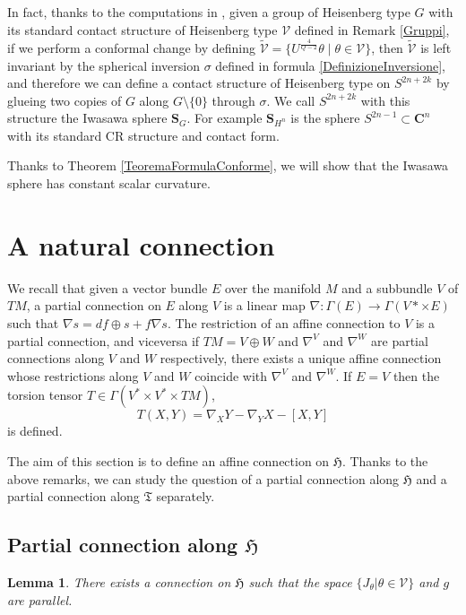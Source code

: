 \documentclass{article}
\newcommand{\ci}[1]{\mathscr{#1}}%
\newcommand{\g}[1]{\mathfrak{#1}}
\newcommand{\C}{\mathbf{C}}
\newtheorem{lemma}[proposizione]{Lemma}
\theoremstyle{definition}
\theoremstyle{remark}
\begin{document}
In fact, thanks to the computations in \cite{CDKR}, given a group of Heisenberg type $G$ with its standard contact structure of Heisenberg type $\ci{V}$ defined in Remark \ref{Gruppi}, if we perform a conformal change by defining $\widetilde{\ci{V}}= \{U^{\frac{4}{Q-2}}\theta\;|\;\theta\in\ci{V}\}$, then $\widetilde{\ci{V}}$ is left invariant by the spherical inversion $\sigma$ defined in formula \ref{DefinizioneInversione}, and therefore we can define a contact structure of Heisenberg type on $S^{2n+2k}$ by glueing two copies of $G$ along $G\setminus\{0\}$ through $\sigma$. We call $S^{2n+2k}$ with this structure the Iwasawa sphere $\bm{S}_G$. For example $\bm{S}_{H^n}$ is the sphere $S^{2n-1}\subset\C^n$ with its standard CR structure and contact form.

Thanks to Theorem \ref{TeoremaFormulaConforme}, we will show that the Iwasawa sphere has constant scalar curvature.

\section{A natural connection}\label{SezioneConnessione}
We recall that given a vector bundle $E$ over the manifold $M$ and a subbundle $V$ of $TM$, a partial connection on $E$ along $V$ is a linear map $\nabla:\Gamma(E)\to\Gamma(V*\times E)$ such that $\nabla s = df\oplus s + f\nabla s$. The restriction of an affine connection to $V$ is a partial connection, and viceversa if $TM=V\oplus W$ and $\nabla^V$ and $\nabla^W$ are partial connections along $V$ and $W$ respectively, there exists a unique affine connection whose restrictions along $V$ and $W$ coincide with $\nabla^V$ and $\nabla^W$.
If $E=V$ then the torsion tensor $T\in\Gamma(V^*\times V^*\times TM)$,
$$T(X,Y) = \nabla_XY-\nabla_YX -[X,Y]$$
is defined.

The aim of this section is to define an affine connection on $\g{H}$. Thanks to the above remarks, we can study the question of a partial connection along $\g{H}$ and a partial connection along $\g{T}$ separately.

\subsection{Partial connection along $\g{H}$}

\begin{lemma}\label{EsistenzaConnessione}
 There exists a connection on $\g{H}$ such that the space $\{J_{\theta}|\theta\in\ci{V}\}$ and $g$ are parallel.
\end{lemma}
\end{document}
